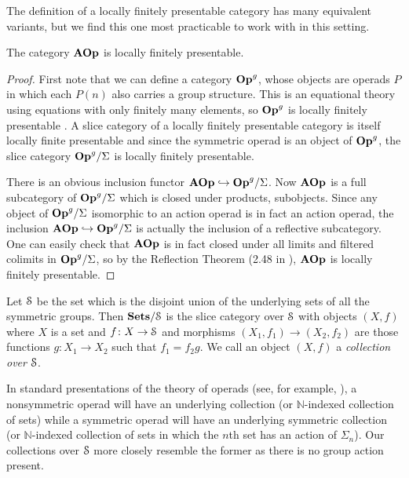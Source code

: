The definition of a locally finitely presentable category has many equivalent variants, but we find this one most practicable to work with in this setting.

\begin{thm}
The category $\mathbf{AOp}$ is locally finitely presentable.
\end{thm}
\begin{proof}
First note that we can define a category $\mathbf{Op}^{g}$, whose objects are operads $P$ in which each $P(n)$ also carries a group structure. This is an equational theory using equations with only finitely many elements, so $\mathbf{Op}^{g}$ is locally finitely presentable \cite[Corollary 3.7]{ar}. A slice category of a locally finitely presentable category is itself locally finite presentable \cite[Proposition 1.57]{ar} and since the symmetric operad is an object of $\mathbf{Op}^{g}$, the slice category $\mathbf{Op}^{g}/\Sigma$ is locally finitely presentable.

There is an obvious inclusion functor $\mathbf{AOp} \hookrightarrow \mathbf{Op}^{g}/\Sigma$. Now $\mathbf{AOp}$ is a full subcategory of $\mathbf{Op}^{g}/\Sigma$ which is closed under products, subobjects. Since any object of $\mathbf{Op}^{g}/\Sigma$ isomorphic to an action operad is in fact an action operad, the inclusion   $\mathbf{AOp} \hookrightarrow \mathbf{Op}^{g}/\Sigma$ is actually the inclusion of a reflective subcategory. One can easily check that $\mathbf{AOp}$ is in fact closed under all limits and filtered colimits in $\mathbf{Op}^{g}/\Sigma$, so by the Reflection Theorem (2.48 in \cite{ar}), $\mathbf{AOp}$ is locally finitely presentable.
\end{proof}

\begin{Defi}
  Let $\mathcal{S}$ be the set which is the disjoint union of the underlying sets of all the symmetric groups. Then $\mathbf{Sets}/\mathcal{S}$ is the slice category over $\mathcal{S}$ with objects $(X,f)$ where $X$ is a set and $f \colon X \rightarrow \mathcal{S}$ and morphisms $(X_{1}, f_{1}) \rightarrow (X_{2}, f_{2})$ are those functions $g \colon X_{1} \rightarrow X_{2}$ such that $f_{1} = f_{2}g$. We call an object $(X,f)$ a \textit{collection over $\mathcal{S}$}.
\end{Defi}

\begin{rem}
In standard presentations of the theory of operads (see, for example, \cite{mss-op}), a nonsymmetric operad will have an underlying collection (or $\mathbb{N}$-indexed collection of sets) while a symmetric operad will have an underlying symmetric collection (or $\mathbb{N}$-indexed collection of sets in which the $n$th set has an action of $\Sigma_{n}$). Our collections over $\mathcal{S}$ more closely resemble the former as there is no group action present.
\end{rem}

